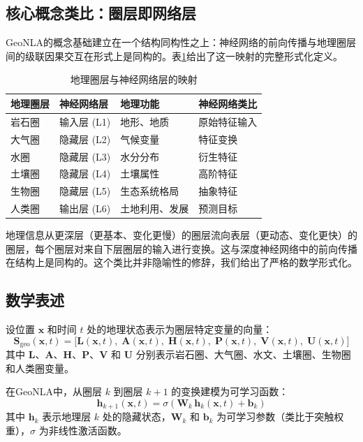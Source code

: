 \documentclass[11pt,a4paper]{article}
\begin{document}
\subsection{核心概念类比：圈层即网络层}

GeoNLA的概念基础建立在一个结构同构性之上：神经网络的前向传播与地理圈层间的级联因果交互在形式上是同构的。表\ref{tab:mapping}给出了这一映射的完整形式化定义。

\begin{table}[htbp]
\centering
\caption{地理圈层与神经网络层的映射}
\label{tab:mapping}
\renewcommand{\arraystretch}{1.2}
\begin{tabular}{@{}llll@{}}
\toprule
地理圈层 & 神经网络层 & 地理功能 & 神经网络类比 \\
\midrule
岩石圈 & 输入层 (L1) & 地形、地质 & 原始特征输入 \\
大气圈 & 隐藏层 (L2) & 气候变量 & 特征变换 \\
水圈 & 隐藏层 (L3) & 水分分布 & 衍生特征 \\
土壤圈 & 隐藏层 (L4) & 土壤属性 & 高阶特征 \\
生物圈 & 隐藏层 (L5) & 生态系统格局 & 抽象特征 \\
人类圈 & 输出层 (L6) & 土地利用、发展 & 预测目标 \\
\bottomrule
\end{tabular}
\end{table}

地理信息从更深层（更基本、变化更慢）的圈层流向表层（更动态、变化更快）的圈层，每个圈层对来自下层圈层的输入进行变换。这与深度神经网络中的前向传播在结构上是同构的。这个类比并非隐喻性的修辞，我们给出了严格的数学形式化。

\subsection{数学表述}
\label{sec:math}

设位置 $\mathbf{x}$ 和时间 $t$ 处的地理状态表示为圈层特定变量的向量：
\begin{equation}
\mathbf{S}_{\text{geo}}(\mathbf{x}, t) = \bigl[\mathbf{L}(\mathbf{x}, t),\; \mathbf{A}(\mathbf{x}, t),\; \mathbf{H}(\mathbf{x}, t),\; \mathbf{P}(\mathbf{x}, t),\; \mathbf{V}(\mathbf{x}, t),\; \mathbf{U}(\mathbf{x}, t)\bigr]
\end{equation}
其中 $\mathbf{L}$、$\mathbf{A}$、$\mathbf{H}$、$\mathbf{P}$、$\mathbf{V}$ 和 $\mathbf{U}$ 分别表示岩石圈、大气圈、水文、土壤圈、生物圈和人类圈变量。

在GeoNLA中，从圈层 $k$ 到圈层 $k{+}1$ 的变换建模为可学习函数：
\begin{equation}
\mathbf{h}_{k+1}(\mathbf{x}, t) = \sigma\!\left(\mathbf{W}_k \,\mathbf{h}_k(\mathbf{x}, t) + \mathbf{b}_k\right)
\end{equation}
其中 $\mathbf{h}_k$ 表示地理层 $k$ 处的隐藏状态，$\mathbf{W}_k$ 和 $\mathbf{b}_k$ 为可学习参数（类比于突触权重），$\sigma$ 为非线性激活函数。
\end{document}
